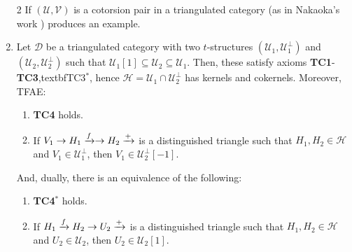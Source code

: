 \begin{examples}
  \begin{enumerate}
    \item[2] If $(\mathcal{U},\mathcal{V})$ is a cotorsion pair in a triangulated
    category (as in Nakaoka's work ) produces an example.
    \item Let $\mathcal{D}$ be a triangulated category with two $t$-structures
    $(\mathcal{U}_1,\mathcal{U}_1^\perp)$ and $(\mathcal{U}_2,\mathcal{U}_2^\perp)$ such that
    $\mathcal{U}_1[1]\subseteq\mathcal{U}_2\subseteq\mathcal{U}_1$. Then, these satisfy
    axioms \textbf{TC1}-\textbf{TC3},textbf{TC3$^*$}, hence $\mathcal{H}=\mathcal{U}_1\cap\mathcal{U}_2^\perp$ has
    kernels and cokernels. Moreover, TFAE:
    \begin{enumerate}
      \item \textbf{TC4} holds.
      \item If $V_1\to H_1\xrightarrow{f}\to H_2\xrightarrow{+}$ is a distinguished triangle such
      that $H_1, H_2\in\mathcal{H}$ and $V_1\in\mathcal{U}_1^\perp$, then $V_1\in\mathcal{U}_2^\perp[-1]$.
    \end{enumerate}
    And, dually, there is an equivalence of the following:
    \begin{enumerate}
      \item \textbf{TC4$^*$} holds.
      \item If $H_1\xrightarrow{f}H_2\to U_2\xrightarrow{+}$ is a distinguished triangle such
      that $H_1,H_2\in\mathcal{H}$ and $U_2\in\mathcal{U}_2$, then $U_2\in\mathcal{U}_2[1]$.
    \end{enumerate}
  \end{enumerate}
\end{examples}
